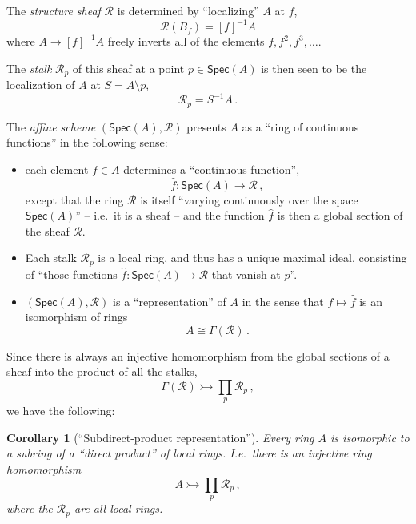 \documentclass[12pt]{article}
\newtheorem*{corollary*}{Corollary}
\theoremstyle{remark}
\theoremstyle{definition}
\newcommand{\myemph}[1]{\emph{#1}}
\begin{document}
The \myemph{structure sheaf} $\mathcal {R}$ is determined by ``localizing'' $A$ at $f$,
\[
\mathcal{R}(B_f) = [f]^{-1}A
\]
where $A \rightarrow [f]^{-1}A$ freely inverts all of the elements $f, f^2, f^3, \dots$.
\medskip

The \myemph{stalk} $\mathcal {R}_p$ of this sheaf at a point $p\in\mathsf{Spec}(A)$ is then seen to be the localization of $A$ at $S = A\setminus p$,
\[
\mathcal{R}_p = S^{-1}A\,.
\]


The \myemph{affine scheme} $(\mathsf{Spec}(A), \mathcal {R})$ presents $A$ as a ``ring of continuous functions'' in the following sense: 
\begin{itemize}
\item each element $f\in A$ determines a ``continuous function'',
\[
\hat{f} : \mathsf{Spec}(A) \to \mathcal {R}\,,
\]
except that the ring $\mathcal{R}$ is itself ``varying continuously over the space $\mathsf{Spec}(A)$'' -- i.e.\ it is a sheaf -- and the function $\hat{f}$ is then a global section of the sheaf $\mathcal{R}$.  

\item Each stalk $\mathcal{R}_p$ is a local ring, and thus has a  unique maximal ideal, consisting of ``those functions  $\hat{f} : \mathsf{Spec}(A) \to \mathcal{R}$ that vanish at $p$''.

\item $(\mathsf{Spec}(A), \mathcal {R})$ is a ``representation'' of $A$ in the sense that $f\mapsto\hat{f}$ is an isomorphism of rings
\[
A \cong \Gamma(\mathcal{R})\,.
\]
\end{itemize}

Since there is always an injective homomorphism from the global sections of a sheaf into the product of all the stalks,
\[
\Gamma(\mathcal{R}) \rightarrowtail \prod_{p}\mathcal{R}_p \,,
\]
we have the following:

\begin{corollary*}[``Subdirect-product representation'']
Every ring $A$ is isomorphic to a {sub}ring of a ``direct product'' of local rings.
I.e.\ there is an injective ring homomorphism
\[
A \rightarrowtail \prod_{p}\mathcal{R}_p \,,
\]
where the $\mathcal{R}_p$ are all local rings.
\end{corollary*}
\end{document}
